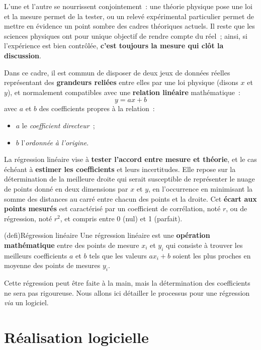 \documentclass[a4paper, 12pt, garamond]{book}
\begin{document}
L'une et l'autre se nourrissent conjointement~: une théorie physique pose une
loi et la mesure permet de la tester, ou un relevé expérimental particulier
permet de mettre en évidence un point sombre des cadres théoriques actuels. Il
reste que les sciences physiques ont pour unique objectif de rendre compte du
réel~; ainsi, si l'expérience est bien contrôlée, \textbf{c'est toujours la
	mesure qui clôt la discussion}.

Dans ce cadre, il est commun de disposer de deux jeux de données réelles
représentant des \textbf{grandeurs reliées} entre elles par une
loi physique (disons $x$ et $y$), et normalement compatibles avec une
\textbf{relation linéaire} mathématique~:
\[
	\boxed{y = ax+b}
\]
avec $a$ et $b$ des coefficients propres à la relation~:
\begin{itemize}
	\item $a$ le \textit{coefficient directeur}~;
	\item $b$ l'\textit{ordonnée à l'origine}.
\end{itemize}

La régression linéaire vise à \textbf{tester l'accord entre mesure
	et théorie}, et le cas échéant à \textbf{estimer les coefficients} et leurs
incertitudes. Elle repose sur la détermination de la meilleure droite qui serait
susceptible de représenter le nuage de points donné en deux dimensions par $x$
et $y$, en l'occurrence en minimisant la somme des distances au carré entre
chacun des points et la droite. Cet \textbf{écart aux points mesurés} est
caractérisé par un coefficient de corrélation, noté $r$, ou de régression, noté
$r^{2}$, et compris entre 0 (nul) et 1 (parfait).

\begin{tcn}(defi){Régression linéaire}
	Une régression linéaire est une \textbf{opération mathématique} entre des
	points de mesure $x_i$ et $y_i$ qui consiste à trouver les meilleurs
	coefficients $a$ et $b$ tels que les valeurs $ax_i+b$ soient les plus proches
	en moyenne des points de mesures $y_i$.
\end{tcn}

Cette régression peut être faite à la main, mais la détermination des
coefficients ne sera pas rigoureuse. Nous allons ici détailler le processus pour
une régression \textit{via} un logiciel.

\section{Réalisation logicielle}
\end{document}
